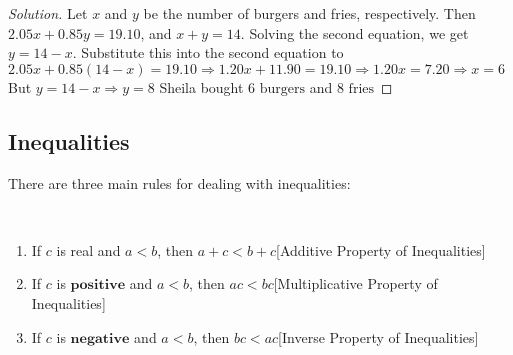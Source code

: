 \documentclass[crop=false,class=book,oneside]{standalone}
\begin{document}
            \begin{proof}[Solution]
            Let $x$ and $y$ be the number of burgers and fries, respectively. Then $2.05x+0.85y=19.10$, and $x+y=14$. Solving the second equation, we get $y=14-x$. Substitute this into the second equation to $2.05x+0.85(14-x)=19.10\Rightarrow 1.20x+11.90=19.10\Rightarrow 1.20x=7.20\Rightarrow\boxed{x=6}$ But $y=14-x\Rightarrow\boxed{y=8}$ Sheila bought $\boxed{6\textrm{ burgers}}$ and $\boxed{8\textrm{ fries}}$
            \end{proof}
        \subsection{Inequalities}
            There are three main rules for dealing with inequalities:
            \begin{properties}\label{property:north_shore_properties_of_inequalities}
            \
            \begin{enumerate}
                \item \label{property:north_shore_additive_property_inequals}If $c$ is real and $a<b$, then $a+c<b+c$\hfill [Additive Property of Inequalities]
                \item \label{property:north_shore_multiplicative_property_inequals}If $c$ is $\mathbf{positive}$ and $a<b$, then $ac < bc$\hfill [Multiplicative Property of Inequalities]
                \item \label{property:north_shore_inverse_property_inequals}If $c$ is $\mathbf{negative}$ and $a<b$, then $bc<ac$\hfill [Inverse Property of Inequalities]
            \end{enumerate}
            \end{properties}
\end{document}
